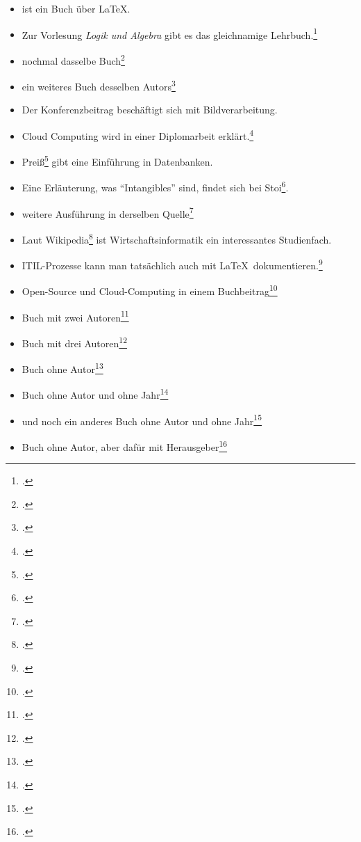\begin{itemize}
\item \cite{Schlosser} ist ein Buch über LaTeX.
\item Zur Vorlesung \emph{Logik und Algebra} gibt es das gleichnamige Lehrbuch.\footcite{Staab}
\item nochmal dasselbe Buch\footcite{Staab}
\item ein weiteres Buch desselben Autors\footcite{BuschlingerStaab}

\item Der Konferenzbeitrag \cite{Ancuti} beschäftigt sich mit Bildverarbeitung.
\item Cloud Computing wird in einer Diplomarbeit erklärt.\footcite[S.~14]{Boettger:Diplomarbeit}
\item Preiß\footcite{Preiss} gibt eine Einführung in Datenbanken.
\item Eine Erläuterung, was \enquote{Intangibles} sind, findet sich bei Stoi\footcite[S.~82]{Stoi}.
\item weitere Ausführung in derselben Quelle\footcite[vgl.][S.~84]{Stoi}
\item Laut Wikipedia\footcite[Abschnitt~5]{wiki:Wirtschaftsinformatik} ist Wirtschaftsinformatik ein interessantes Studienfach.
\item ITIL-Prozesse kann man tatsächlich auch mit \LaTeX\ dokumentieren.\footcite{Carvalho:PJ:2012-1}
\item Open-Source und Cloud-Computing in einem Buchbeitrag\footcite{Wind}
\item Buch mit zwei Autoren\footcite{MitZweiAutoren}
\item Buch mit drei Autoren\footcite{MitDreiAutoren}
\item Buch ohne Autor\footcite{OhneAutoren}
\item Buch ohne Autor und ohne Jahr\footcite{OhneAutorenOhneJahr}
\item und noch ein anderes Buch ohne Autor und ohne Jahr\footcite{OhneAutorenOhneJahr2}
\item Buch ohne Autor, aber dafür mit Herausgeber\footcite{keinAutorAberHerausgeber}


\end{itemize}
